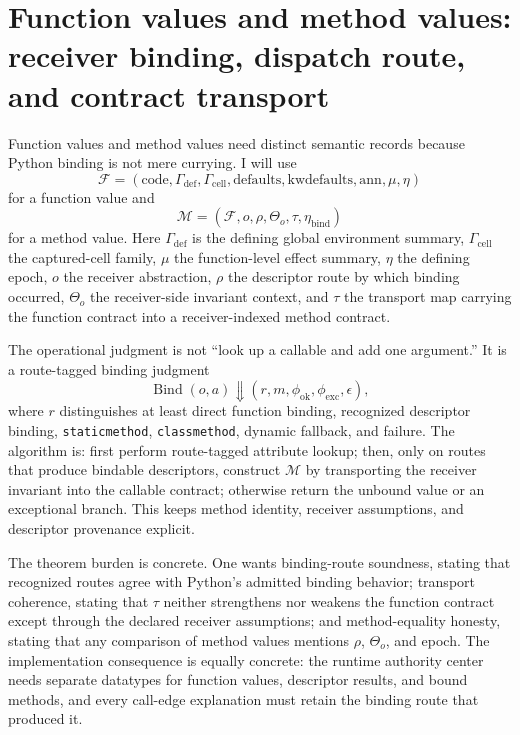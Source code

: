 \documentclass[11pt]{report}
\begin{document}
\section{Function values and method values: receiver binding, dispatch route, and contract transport}
Function values and method values need distinct semantic records because Python binding is not mere currying. I will use
\[
\mathcal{F} = (\mathrm{code}, \Gamma_{\mathrm{def}}, \Gamma_{\mathrm{cell}}, \mathrm{defaults}, \mathrm{kwdefaults}, \mathrm{ann}, \mu, \eta)
\]
for a function value and
\[
\mathcal{M} = (\mathcal{F}, o, \rho, \Theta_o, \tau, \eta_{\mathrm{bind}})
\]
for a method value. Here $\Gamma_{\mathrm{def}}$ is the defining global environment summary, $\Gamma_{\mathrm{cell}}$ the captured-cell family, $\mu$ the function-level effect summary, $\eta$ the defining epoch, $o$ the receiver abstraction, $\rho$ the descriptor route by which binding occurred, $\Theta_o$ the receiver-side invariant context, and $\tau$ the transport map carrying the function contract into a receiver-indexed method contract.

The operational judgment is not ``look up a callable and add one argument.'' It is a route-tagged binding judgment
\[
\operatorname{Bind}(o,a) \Downarrow (r, m, \phi_{\mathrm{ok}}, \phi_{\mathrm{exc}}, \epsilon),
\]
where $r$ distinguishes at least direct function binding, recognized descriptor binding, \texttt{staticmethod}, \texttt{classmethod}, dynamic fallback, and failure. The algorithm is: first perform route-tagged attribute lookup; then, only on routes that produce bindable descriptors, construct $\mathcal{M}$ by transporting the receiver invariant into the callable contract; otherwise return the unbound value or an exceptional branch. This keeps method identity, receiver assumptions, and descriptor provenance explicit.

The theorem burden is concrete. One wants binding-route soundness, stating that recognized routes agree with Python's admitted binding behavior; transport coherence, stating that $\tau$ neither strengthens nor weakens the function contract except through the declared receiver assumptions; and method-equality honesty, stating that any comparison of method values mentions $\rho$, $\Theta_o$, and epoch. The implementation consequence is equally concrete: the runtime authority center needs separate datatypes for function values, descriptor results, and bound methods, and every call-edge explanation must retain the binding route that produced it.
\end{document}

